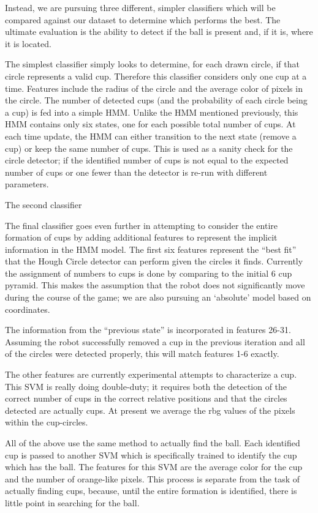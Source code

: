 \documentclass[letterpaper, 10 pt, conference]{ieeeconf}  %
\begin{document}
Instead, we are pursuing three different, simpler classifiers which will be compared against our dataset to determine which performs the best.  The ultimate evaluation is the ability to detect if the ball is present and, if it is, where it is located.

The simplest classifier simply looks to determine, for each drawn circle, if that circle represents a valid cup.  Therefore this classifier considers only one cup at a time.  Features include the radius of the circle and the average color of pixels in the circle.  The number of detected cups (and the probability of each circle being a cup) is fed into a simple HMM.  Unlike the HMM mentioned previously, this HMM contains only six states, one for each possible total number of cups.  At each time update, the HMM can either transition to the next state (remove a cup) or keep the same number of cups.  This is used as a sanity check for the circle detector; if the identified number of cups is not equal to the expected number of cups or one fewer than the detector is re-run with different parameters.

The second classifier

The final classifier goes even further in attempting to consider the entire formation of cups by adding additional features to represent the implicit information in the HMM model.  The first six features represent the “best fit” that the Hough Circle detector can perform given the circles it finds.  Currently the assignment of numbers to cups is done by comparing to the initial 6 cup pyramid.  This makes the assumption that the robot does not significantly move during the course of the game; we are also pursuing an ‘absolute’ model based on coordinates.

The information from the “previous state” is incorporated in features 26-31.  Assuming the robot successfully removed a cup in the previous iteration and all of the circles were detected properly, this will match features 1-6 exactly.

The other features are currently experimental attempts to characterize a cup.  This SVM is really doing double-duty; it requires both the detection of the correct number of cups in the correct relative positions and that the circles detected are actually cups.  At present we average the rbg values of the pixels within the cup-circles.

All of the above use the same method to actually find the ball.  Each identified cup is passed to another SVM which is specifically trained to identify the cup which has the ball.  The features for this SVM are the average color for the cup and the number of orange-like pixels.  This process is separate from the task of actually finding cups, because, until the entire formation is identified, there is little point in searching for the ball.
\end{document}
